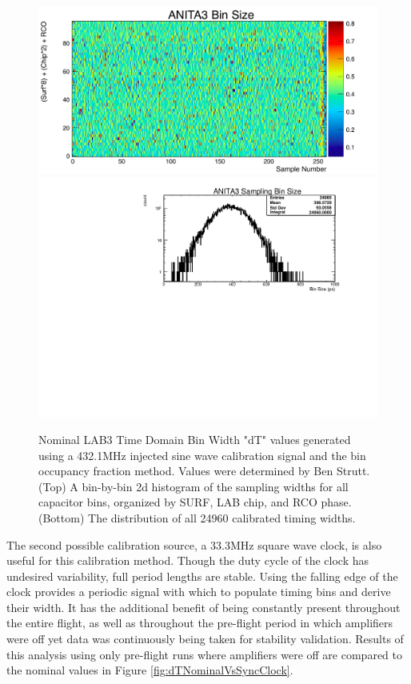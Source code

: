 	\begin{figure}
		\centering
		\includegraphics[width=\textwidth]{figures/ANITA3BinSize}
		\includegraphics[width=\textwidth]{figures/dTNominal}
		\caption{Nominal LAB3 Time Domain Bin Width "dT" values generated using a 432.1MHz injected sine wave calibration signal and the bin occupancy fraction method.  Values were determined by Ben Strutt\cite{BenSThesis}. (Top) A bin-by-bin 2d histogram of the sampling widths for all capacitor bins, organized by SURF, LAB chip, and RCO phase.  (Bottom) The distribution of all 24960 calibrated timing widths.}
		\label{fig:dTNominal}
	\end{figure}
		
		The second possible calibration source, a 33.3MHz square wave clock, is also useful for this calibration method.  Though the duty cycle of the clock has undesired variability, full period lengths are stable.  Using the falling edge of the clock provides a periodic signal with which to populate timing bins and derive their width.  It has the additional benefit of being constantly present throughout the entire flight, as well as throughout the pre-flight period in which amplifiers were off yet data was continuously being taken for stability validation.  Results of this analysis using only pre-flight runs where amplifiers were off are compared to the nominal values in Figure \ref{fig:dTNominalVsSyncClock}.
		
